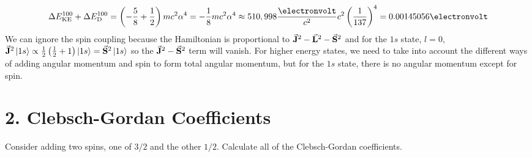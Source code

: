 \documentclass[a4paper,twoside]{article}
\begin{document}
\begin{problem}
    \begin{equation}
        \Delta E_{\text{KE}}^{100} + \Delta E_{\text{D}}^{100} = \left(- \frac{5}{8} + \frac{1}{2} \right) m c^2 \alpha^4 = - \frac{1}{8} mc^2 \alpha^4 \approx 510,998 \frac{\electronvolt}{c^2} c^2 \left( \frac{1}{137} \right)^4 = 0.00145056\electronvolt
    \end{equation}
    We can ignore the spin coupling because the Hamiltonian is proportional to $ \va{J}^2 - \va{L}^2 - \va{S}^2 $ and for the $ 1s $ state, $ l = 0 $, $ \va{J}^2\ket{1s} \propto \frac{1}{2} \left( \frac{1}{2} + 1 \right)\ket{1s} = \va{S}^2\ket{1s} $ so the $ \va{J}^2 - \va{S}^2 $ term will vanish. For higher energy states, we need to take into account the different ways of adding angular momentum and spin to form total angular momentum, but for the $ 1s $ state, there is no angular momentum except for spin.
\end{problem}

\section*{2. Clebsch-Gordan Coefficients}
Consider adding two spins, one of $ 3/2 $ and the other $ 1/2 $. Calculate all of the Clebsch-Gordan coefficients.
\end{document}
